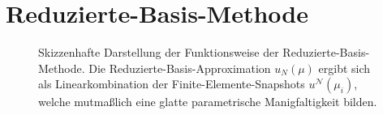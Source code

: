 
\chapter{Reduzierte-Basis-Methode} %
\label{cha:reduzierte_basis_methode}


\blindtext


\begin{figure}[tb]
    \centering
    
    \caption[%
    Skizzenhafte Darstellung der Funktionsweise der Reduzierte-Basis-Methode.
    ]{
        Skizzenhafte Darstellung der Funktionsweise der Reduzierte-Basis-Methode.
        Die Reduzierte-Basis-Approximation $u_{N}(\mu)$ ergibt sich als Linearkombination der Finite-Elemente-Snapshots $u^{\mathcal N}(\mu_{i})$, welche mutmaßlich eine glatte parametrische Manigfaltigkeit bilden.
        }
    \label{fig:figure1}
\end{figure}


